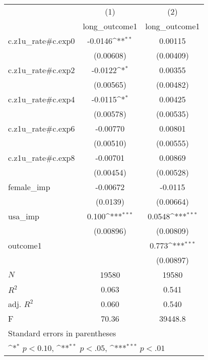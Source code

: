 {
\def\sym#1{\ifmmode^{#1}\else\(^{#1}\)\fi}
\begin{tabular}{l*{2}{c}}
\hline\hline
            &\multicolumn{1}{c}{(1)}&\multicolumn{1}{c}{(2)}\\
            &\multicolumn{1}{c}{long\_outcome1}&\multicolumn{1}{c}{long\_outcome1}\\
\hline
c.z1u\_rate#c.exp0&     -0.0146\sym{**} &     0.00115         \\
            &   (0.00608)         &   (0.00409)         \\
[1em]
c.z1u\_rate#c.exp2&     -0.0122\sym{*}  &     0.00355         \\
            &   (0.00565)         &   (0.00482)         \\
[1em]
c.z1u\_rate#c.exp4&     -0.0115\sym{*}  &     0.00425         \\
            &   (0.00578)         &   (0.00535)         \\
[1em]
c.z1u\_rate#c.exp6&    -0.00770         &     0.00801         \\
            &   (0.00510)         &   (0.00555)         \\
[1em]
c.z1u\_rate#c.exp8&    -0.00701         &     0.00869         \\
            &   (0.00454)         &   (0.00528)         \\
[1em]
female\_imp  &    -0.00672         &     -0.0115         \\
            &    (0.0139)         &   (0.00664)         \\
[1em]
usa\_imp     &       0.100\sym{***}&      0.0548\sym{***}\\
            &   (0.00896)         &   (0.00809)         \\
[1em]
outcome1    &                     &       0.773\sym{***}\\
            &                     &   (0.00897)         \\
\hline
\(N\)       &       19580         &       19580         \\
\(R^{2}\)   &       0.063         &       0.541         \\
adj. \(R^{2}\)&       0.060         &       0.540         \\
F           &       70.36         &     39448.8         \\
\hline\hline
\multicolumn{3}{l}{\footnotesize Standard errors in parentheses}\\
\multicolumn{3}{l}{\footnotesize \sym{*} \(p<0.10\), \sym{**} \(p<.05\), \sym{***} \(p<.01\)}\\
\end{tabular}
}
